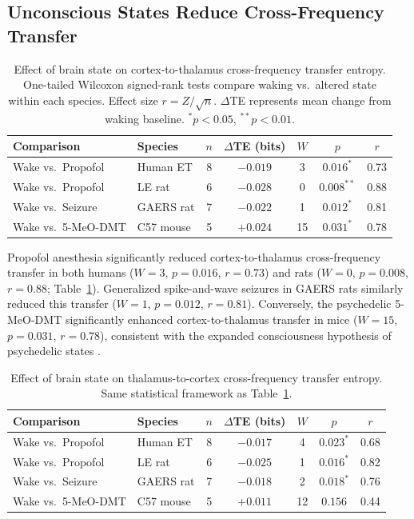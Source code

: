 \documentclass[11pt]{article}
\begin{document}
\subsection{Unconscious States Reduce Cross-Frequency Transfer}

\begin{table}[H]
\centering
\caption{Effect of brain state on cortex-to-thalamus cross-frequency transfer entropy. One-tailed Wilcoxon signed-rank tests compare waking vs.\ altered state within each species. Effect size $r = Z / \sqrt{n}$. $\Delta$TE represents mean change from waking baseline. $^{*}p<0.05$, $^{**}p<0.01$.}
\label{tab:ctx_thal}
\begin{tabular}{llccccc}
\toprule
Comparison & Species & $n$ & $\Delta$TE (bits) & $W$ & $p$ & $r$ \\
\midrule
Wake vs.\ Propofol & Human ET & 8 & $-0.019$ & 3 & $0.016^{*}$ & 0.73 \\
Wake vs.\ Propofol & LE rat & 6 & $-0.028$ & 0 & $0.008^{**}$ & 0.88 \\
Wake vs.\ Seizure & GAERS rat & 7 & $-0.022$ & 1 & $0.012^{*}$ & 0.81 \\
Wake vs.\ 5-MeO-DMT & C57 mouse & 5 & $+0.024$ & 15 & $0.031^{*}$ & 0.78 \\
\bottomrule
\end{tabular}
\end{table}

Propofol anesthesia significantly reduced cortex-to-thalamus cross-frequency transfer in both humans ($W = 3$, $p = 0.016$, $r = 0.73$) and rats ($W = 0$, $p = 0.008$, $r = 0.88$; Table~\ref{tab:ctx_thal}). Generalized spike-and-wave seizures in GAERS rats similarly reduced this transfer ($W = 1$, $p = 0.012$, $r = 0.81$). Conversely, the psychedelic 5-MeO-DMT significantly enhanced cortex-to-thalamus transfer in mice ($W = 15$, $p = 0.031$, $r = 0.78$), consistent with the expanded consciousness hypothesis of psychedelic states \citep{carhart2016neural}.

\begin{table}[H]
\centering
\caption{Effect of brain state on thalamus-to-cortex cross-frequency transfer entropy. Same statistical framework as Table~\ref{tab:ctx_thal}.}
\label{tab:thal_ctx}
\begin{tabular}{llccccc}
\toprule
Comparison & Species & $n$ & $\Delta$TE (bits) & $W$ & $p$ & $r$ \\
\midrule
Wake vs.\ Propofol & Human ET & 8 & $-0.017$ & 4 & $0.023^{*}$ & 0.68 \\
Wake vs.\ Propofol & LE rat & 6 & $-0.025$ & 1 & $0.016^{*}$ & 0.82 \\
Wake vs.\ Seizure & GAERS rat & 7 & $-0.018$ & 2 & $0.018^{*}$ & 0.76 \\
Wake vs.\ 5-MeO-DMT & C57 mouse & 5 & $+0.011$ & 12 & $0.156$ & 0.44 \\
\bottomrule
\end{tabular}
\end{table}
\end{document}
